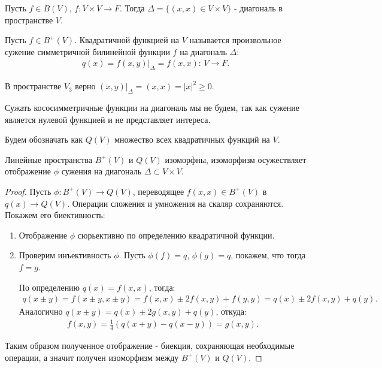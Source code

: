 \begin{definition}
    Пусть $f \in B(V)$, $f: V \times V \to F$. Тогда $\Delta = \{(x, x) \in V \times V\}$ - 
    диагональ в пространстве $V$.
\end{definition}

\begin{definition} 
    Пусть $f \in B^{+}(V)$. Квадратичной функцией на $V$ называется произвольное сужение симметричной 
    билинейной функции $f$ на диагональ $\Delta$:
    \begin{gather*}
        q(x) = f(x, y) \vert_{\Delta} = f(x, x): \, V \to F.
    \end{gather*} 
\end{definition}

\begin{note}
    В пространстве $V_3$ верно $(x, y)\vert_{\Delta} = (x, x) = |x|^2 \geq 0$.
\end{note}

\begin{note}
    Сужать кососимметричные функции на диагональ мы не будем, так как сужение является нулевой 
    функцией и не представляет интереса.
\end{note}

\begin{agreement}
    Будем обозначать как $Q(V)$ множество всех квадратичных функций на $V$.
\end{agreement}

\begin{theorem}
    Линейные пространства $B^+(V)$ и $Q(V)$ изоморфны, изоморфизм осужествляет отображение $\phi$ 
    сужения на диагональ $\Delta \subset V \times V$.
\end{theorem}

\begin{proof}
    Пусть $\phi: B^+(V) \to Q(V)$, переводящее $f(x, x) \in B^+(V)$ в $q(x) \to Q(V)$. 
    Операции сложения и умножения на скаляр сохраняются. Покажем его биективность:
    \begin{enumerate}
        \item Отображение $\phi$ сюрьективно по определению квадратичной функции.  
        \item Проверим инъективность $\phi$. Пусть $\phi(f) = q$, $\phi(g) = q$, покажем, что тогда 
        $f = g$. 
        
        По определению $q(x) = f(x, x)$, тогда:
        \begin{gather*}
            q(x \pm y) = f(x \pm y, x \pm y) = f(x, x) \pm 2 f(x, y) + f(y, y) =
            q(x) \pm 2 f(x, y) + q(y).
        \end{gather*}
        Аналогично $q(x \pm y) = q(x) \pm 2 g(x, y) + q(y)$, откуда:
        \begin{gather*}
            f(x, y) = \frac{1}{4} (q(x+y) - q(x-y)) = g(x, y).
        \end{gather*} 
    \end{enumerate} 
    Таким образом полученное отображение - биекция, сохраняющая необходимые операции, а значит 
    получен изоморфизм между $B^+(V)$ и $Q(V)$.
\end{proof}

